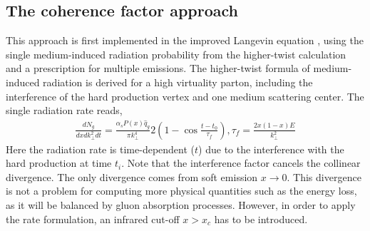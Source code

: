 \subsection{The coherence factor approach}
This approach is first implemented in the improved Langevin equation \cite{Cao:2013ita}, using the single medium-induced radiation probability from the higher-twist calculation \cite{Majumder:2009ge,Wang:2001ifa} and a prescription for multiple emissions.
The higher-twist formula of medium-induced radiation is derived for a high virtuality parton, including the interference of the hard production vertex and one medium scattering center.
The single radiation rate reads,
\begin{eqnarray}
\frac{dN_g}{dx dk_\perp^2 dt} = \frac{\alpha_s P(x)\hat{q}_g}{\pi k_\perp^4} 2\left(1-\cos\frac{t-t_0}{\tau_f}\right), \tau_f = \frac{2x(1-x)E}{k_\perp^2}
\end{eqnarray}
Here the radiation rate is time-dependent ($t$) due to the interference with the hard production at time $t_i$. 
Note that the interference factor cancels the collinear divergence. 
The only divergence comes from soft emission $x\rightarrow 0$. 
This divergence is not a problem for computing more physical quantities such as the energy loss, as it will be balanced by gluon absorption processes.
However, in order to apply the rate formulation, an infrared cut-off $x>x_c$ has to be introduced. 

